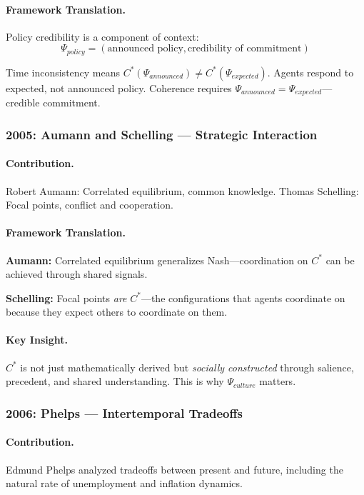 \documentclass[12pt,a4paper]{article}
\begin{document}
\paragraph{Framework Translation.}
Policy credibility is a component of context:
\begin{equation}
  \Psi_{policy} = (\text{announced policy}, \text{credibility of commitment})
\end{equation}

Time inconsistency means $C^*(\Psi_{announced}) \neq C^*(\Psi_{expected})$.
Agents respond to expected, not announced policy.
Coherence requires $\Psi_{announced} = \Psi_{expected}$---credible commitment.

\subsubsection{2005: Aumann and Schelling --- Strategic Interaction}

\paragraph{Contribution.}
Robert Aumann: Correlated equilibrium, common knowledge.
Thomas Schelling: Focal points, conflict and cooperation.

\paragraph{Framework Translation.}
\textbf{Aumann:} Correlated equilibrium generalizes Nash---coordination on $C^*$ 
can be achieved through shared signals.

\textbf{Schelling:} Focal points \emph{are} $C^*$---the configurations that agents
coordinate on because they expect others to coordinate on them.

\paragraph{Key Insight.}
$C^*$ is not just mathematically derived but \emph{socially constructed}
through salience, precedent, and shared understanding.
This is why $\Psi_{culture}$ matters.

\subsubsection{2006: Phelps --- Intertemporal Tradeoffs}

\paragraph{Contribution.}
Edmund Phelps analyzed tradeoffs between present and future,
including the natural rate of unemployment and inflation dynamics.
\end{document}
